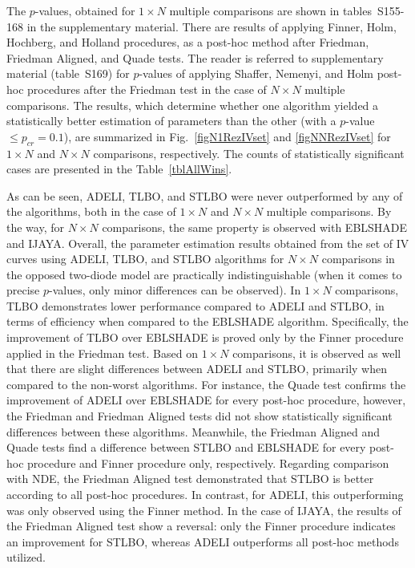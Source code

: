 \documentclass[a4paper,fleqn]{cas-dc}
\begin{document}

The $p$-values, obtained for $1\times N$ multiple comparisons are shown in tables~S155-168 in the supplementary material.
There are results of applying  Finner, Holm, Hochberg, and Holland procedures,
as a post-hoc method after Friedman, Friedman Aligned, and Quade tests.
The reader is referred to supplementary material (table~S169) for $p$-values of
applying  Shaffer, Nemenyi, and Holm post-hoc procedures after the Friedman test in the
case of $N\times N$ multiple comparisons.
The results, which determine whether one algorithm yielded a statistically better estimation of parameters
than the other (with a $p$-value $\leq p_{cr}=0.1$), are summarized in Fig.~\ref{figN1RezIVset} and \ref{figNNRezIVset}
for $1\times N$ and $N\times N$ comparisons, respectively.
The counts of statistically  significant cases are presented in the Table~\ref{tblAllWins}.

As can be seen,
ADELI, TLBO, and STLBO were never outperformed by any of the algorithms,
both in the case of $1\times N$ and $N\times N$ multiple comparisons.
By the way, for $N\times N$ comparisons, the same property is observed with EBLSHADE and IJAYA.
Overall, the parameter estimation results obtained from the set of IV curves
using ADELI, TLBO, and STLBO algorithms for $N\times N$ comparisons in the opposed two-diode model are practically indistinguishable
(when it comes to precise $p$-values, only minor differences can be observed).
In $1\times N$ comparisons, TLBO demonstrates lower performance compared to ADELI and STLBO,
in terms of efficiency when compared to the EBLSHADE algorithm.
Specifically, the improvement of TLBO over EBLSHADE is proved only by the Finner procedure applied in the Friedman test.
Based on $1\times N$ comparisons, it is observed as well that there are slight differences between ADELI and STLBO,
primarily when compared to the non-worst algorithms.
For instance, the Quade test confirms the improvement of ADELI over EBLSHADE for every post-hoc procedure,
however, the Friedman and Friedman Aligned tests did not show statistically significant differences between these algorithms.
Meanwhile, the Friedman Aligned and Quade tests find a difference between STLBO and EBLSHADE
for every post-hoc procedure and Finner procedure only, respectively.
Regarding comparison with NDE, the Friedman Aligned test demonstrated that STLBO is better according to all post-hoc procedures.
In contrast, for ADELI, this outperforming was only observed using the Finner method.
In the case of IJAYA,
the results of the Friedman Aligned test show a reversal:
only the Finner procedure indicates an improvement for STLBO,
whereas ADELI outperforms all post-hoc methods utilized.
\end{document}

